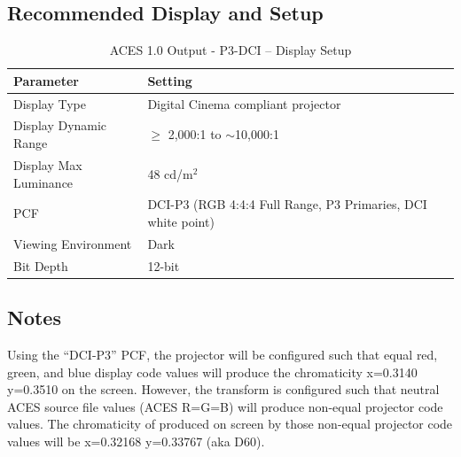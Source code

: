 \subsection{Recommended Display and Setup}
\label{subsec:setup-p3dci}


\begin{table}[ht!]
    \centering
        \begin{tabular}{|p{1.5in}|p{3in}|}
            \hline
            \textbf{Parameter} & \textbf{Setting} \\ \hline
            Display Type & Digital Cinema compliant projector \\ \hline
            Display Dynamic Range & $\geq$ 2,000:1 to $\sim$10,000:1 \\ \hline
            Display Max Luminance & 48 cd/m$^2$\\ \hline
            PCF & DCI-P3 (RGB 4:4:4 Full Range, P3 Primaries, DCI white point) \\ \hline
            Viewing Environment & Dark \\ \hline
            Bit Depth & 12-bit \\ \hline 
    \end{tabular}
    \caption[ACES 1.0 Output - P3-DCI -- Display Setup]{\small ACES 1.0 Output - P3-DCI -- Display Setup} 
    \label{tab:setup-p3dci}
\end{table}

\subsection{Notes}
\label{subsec:notes-p3dci}

Using the ``DCI-P3'' PCF, the projector will be configured such that
equal red, green, and blue display code values will produce the
chromaticity x=0.3140 y=0.3510 on the screen. However, the
\texttt{} transform is configured such
that neutral ACES source file values (ACES R=G=B) will produce non-equal
projector code values. The chromaticity of produced on screen by those
non-equal projector code values will be x=0.32168 y=0.33767 (aka D60).

